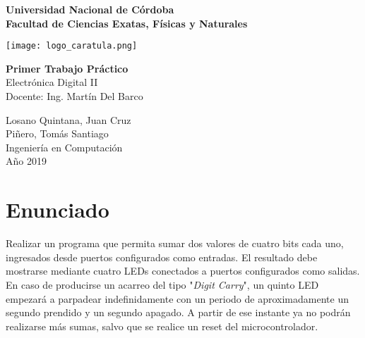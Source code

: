 \documentclass[12pt,a4paper]{article}
\renewcommand{\baselinestretch}{1} %
\begin{document}
\begin{titlepage}
    \begin{center}
        \vspace*{1cm}
        
        \Large
        \textbf{Universidad Nacional de Córdoba\\
        		Facultad de Ciencias Exatas, Físicas y Naturales}
        
        \vspace{0.5cm}
        \texttt{[image: logo\_caratula.png]}
        
        \vspace{1.5cm}
        
        \textbf{Primer Trabajo Práctico}\\
        Electrónica Digital II\\
        Docente: Ing. Martín Del Barco
        
        \vfill  
        
        \vspace{0.8cm}
        

        
        \Large
        Losano Quintana, Juan Cruz\\
        Piñero, Tomás Santiago\\
        Ingeniería en Computación\\
        Año 2019\\
        
        
    \end{center}
\end{titlepage}

\tableofcontents
\setcounter{secnumdepth}{1}


\newpage
\renewcommand{\baselinestretch}{1}
\setlength{\parskip}{0.5em}

\section{Enunciado}
	Realizar un programa que permita sumar dos valores de cuatro bits cada uno, ingresados desde puertos configurados como entradas. El resultado debe mostrarse mediante cuatro LEDs conectados a puertos configurados como salidas. En caso de producirse un acarreo del tipo "\emph{Digit Carry}", un quinto LED empezará a parpadear indefinidamente con un periodo de aproximadamente un segundo prendido y un segundo apagado. A partir de ese instante ya no podrán realizarse más sumas, salvo que se realice un reset del microcontrolador.
	
\end{document}

